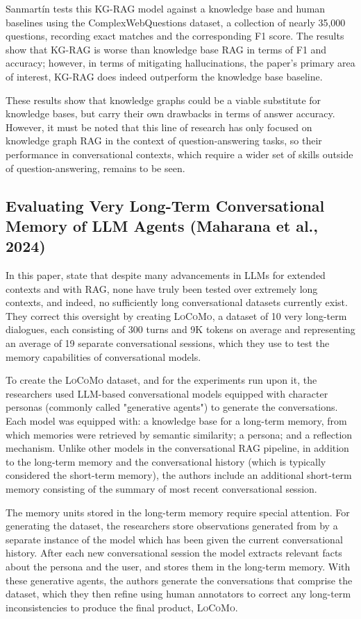 Sanmartín tests this KG-RAG model against a knowledge base and human baselines using the ComplexWebQuestions dataset, a collection of nearly 35,000 questions, recording exact matches and the corresponding F1 score. The results show that KG-RAG is worse than knowledge base RAG in terms of F1 and accuracy; however, in terms of mitigating hallucinations, the paper's primary area of interest, KG-RAG does indeed outperform the knowledge base baseline.
	
These results show that knowledge graphs could be a viable substitute for knowledge bases, but carry their own drawbacks in terms of answer accuracy. However, it must be noted that this line of research has only focused on knowledge graph RAG in the context of question-answering tasks, so their performance in conversational contexts, which require a wider set of skills outside of question-answering, remains to be seen.


\subsection{Evaluating Very Long-Term Conversational Memory of LLM Agents (Maharana et al., 2024)}

In this paper, \cite{Maharana2024} state that despite many advancements in LLMs for extended contexts and with RAG, none have truly been tested over extremely long contexts, and indeed, no sufficiently long conversational datasets currently exist. They correct this oversight by creating \textsc{LoCoMo}, a dataset of 10 very long-term dialogues, each consisting of 300 turns and 9K tokens on average and representing an average of 19 separate conversational sessions, which they use to test the memory capabilities of conversational models.

To create the \textsc{LoCoMo} dataset, and for the experiments run upon it, the researchers used LLM-based conversational models equipped with character personas (commonly called "generative agents") to generate  the conversations. Each model was equipped with: a knowledge base for a long-term memory, from which memories were retrieved by semantic similarity; a persona; and a reflection mechanism. Unlike other models in the conversational RAG pipeline, in addition to the long-term memory and the conversational history (which is typically considered the short-term memory), the authors include an additional short-term memory consisting of the summary of most recent conversational session. 
	
The memory units stored in the long-term memory require special attention. For generating the dataset, the researchers store observations generated from by a separate instance of the model which has been given the current conversational history. After each new conversational session the model extracts relevant facts about the persona and the user, and stores them in the long-term memory. With these generative agents, the authors generate the conversations that comprise the dataset, which they then refine using human annotators to correct any long-term inconsistencies to produce the final product, \textsc{LoCoMo}. 
	
